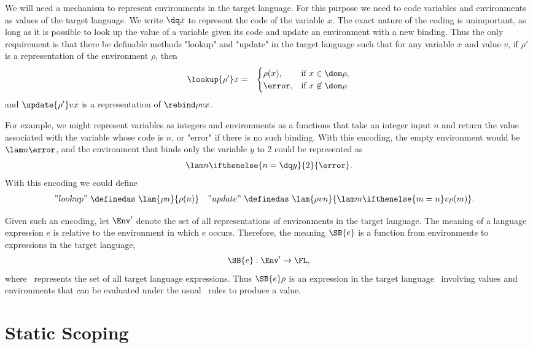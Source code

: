 We will need a mechanism to represent environments in the target language.  For this purpose we need to
code variables and environments as values of the target language.  We write $\dq x$ to represent the
code of the variable $x$.  The exact nature of the coding is unimportant,
as long as it is possible to look up the value of a variable
given its code and update an environment with a new binding.
Thus the only requirement is that there be definable methods "lookup" and "update" in the target language such that for any variable $x$ and value $v$, if $\rho'$ is a representation of the environment $\rho$, then
\begin{eqnarray*}
\lookup{\rho'}x &=& \begin{cases}
\rho(x), & \text{if } x\in\dom\rho,\\
\error, & \text{if } x\not\in\dom\rho
\end{cases}
\end{eqnarray*}
and $\update{\rho'}vx$ is a representation of $\rebind\rho v x$.

For example, we might represent variables
as integers and environments as a functions that take an integer input $n$ and return the value associated
with the variable whose code is $n$, or "error" if there is no such binding.  With this encoding, the
empty environment would be $\lam n{\error}$,
and the environment that binds only the variable $y$ to 2 could be represented as
\[
\lam n{\ifthenelse{n = \dq y}{2}{\error}}.
\]
With this encoding we could define
\begin{align*}
"lookup"\ &\definedas\ \lam{\rho n}{\rho(n)} &
"update"\ &\definedas\ \lam{\rho vn}{\lam m{\ifthenelse{m=n}v{\rho(m)}}}.
\end{align*}

Given such an encoding, let $\Env'$ denote the set of all representations of environments
in the target language.
The meaning of a language expression $e$ is relative to the environment
in which $e$ occurs. Therefore, the meaning $\SB{e}$ is a function from
environments to expressions in the target language,
\begin{displaymath}
\SB{e} : \Env' \to \FL,
\end{displaymath}
where \FL\ represents the set of all target language expressions.
Thus $\SB{e} \rho$ is an expression in the target language \FL\ involving values and environments
that can be evaluated under the usual \FL\ rules to produce a value.

\section{Static Scoping}

